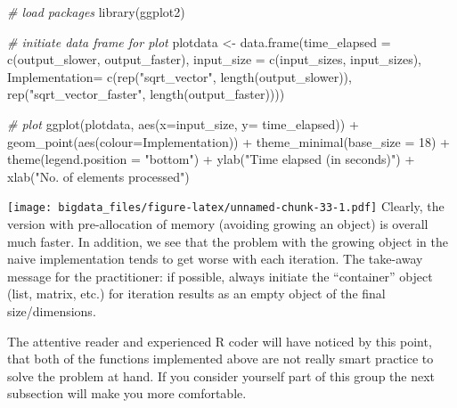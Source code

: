\documentclass[
  12pt,
]{style/krantz}
\newenvironment{Shaded}{\begin{snugshade}}{\end{snugshade}}
\newcommand{\AttributeTok}[1]{\textcolor[rgb]{0.77,0.63,0.00}{#1}}
\newcommand{\CommentTok}[1]{\textcolor[rgb]{0.56,0.35,0.01}{\textit{#1}}}
\newcommand{\DecValTok}[1]{\textcolor[rgb]{0.00,0.00,0.81}{#1}}
\newcommand{\FunctionTok}[1]{\textcolor[rgb]{0.00,0.00,0.00}{#1}}
\newcommand{\NormalTok}[1]{#1}
\newcommand{\OtherTok}[1]{\textcolor[rgb]{0.56,0.35,0.01}{#1}}
\newcommand{\SpecialCharTok}[1]{\textcolor[rgb]{0.00,0.00,0.00}{#1}}
\newcommand{\StringTok}[1]{\textcolor[rgb]{0.31,0.60,0.02}{#1}}
\begin{document}
\begin{Shaded}
\begin{Highlighting}[]
\CommentTok{\# load packages}
\FunctionTok{library}\NormalTok{(ggplot2)}

\CommentTok{\# initiate data frame for plot}
\NormalTok{plotdata }\OtherTok{\textless{}{-}} \FunctionTok{data.frame}\NormalTok{(}\AttributeTok{time\_elapsed =} \FunctionTok{c}\NormalTok{(output\_slower, output\_faster),}
                       \AttributeTok{input\_size =} \FunctionTok{c}\NormalTok{(input\_sizes, input\_sizes),}
                       \AttributeTok{Implementation=} \FunctionTok{c}\NormalTok{(}\FunctionTok{rep}\NormalTok{(}\StringTok{"sqrt\_vector"}\NormalTok{, }\FunctionTok{length}\NormalTok{(output\_slower)),}
                            \FunctionTok{rep}\NormalTok{(}\StringTok{"sqrt\_vector\_faster"}\NormalTok{, }\FunctionTok{length}\NormalTok{(output\_faster))))}

\CommentTok{\# plot}
\FunctionTok{ggplot}\NormalTok{(plotdata, }\FunctionTok{aes}\NormalTok{(}\AttributeTok{x=}\NormalTok{input\_size, }\AttributeTok{y=}\NormalTok{ time\_elapsed)) }\SpecialCharTok{+}
     \FunctionTok{geom\_point}\NormalTok{(}\FunctionTok{aes}\NormalTok{(}\AttributeTok{colour=}\NormalTok{Implementation)) }\SpecialCharTok{+}
     \FunctionTok{theme\_minimal}\NormalTok{(}\AttributeTok{base\_size =} \DecValTok{18}\NormalTok{) }\SpecialCharTok{+}
     \FunctionTok{theme}\NormalTok{(}\AttributeTok{legend.position =} \StringTok{"bottom"}\NormalTok{) }\SpecialCharTok{+}
     \FunctionTok{ylab}\NormalTok{(}\StringTok{"Time elapsed (in seconds)"}\NormalTok{) }\SpecialCharTok{+}
     \FunctionTok{xlab}\NormalTok{(}\StringTok{"No. of elements processed"}\NormalTok{) }
\end{Highlighting}
\end{Shaded}

\texttt{[image: bigdata\_files/figure-latex/unnamed-chunk-33-1.pdf]}
Clearly, the version with pre-allocation of memory (avoiding growing an object) is overall much faster. In addition, we see that the problem with the growing object in the naive implementation tends to get worse with each iteration. The take-away message for the practitioner: if possible, always initiate the ``container'' object (list, matrix, etc.) for iteration results as an empty object of the final size/dimensions.

The attentive reader and experienced R coder will have noticed by this point, that both of the functions implemented above are not really smart practice to solve the problem at hand. If you consider yourself part of this group the next subsection will make you more comfortable.
\end{document}
